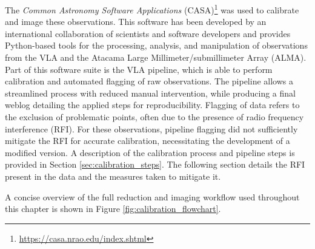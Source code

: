 The \textit{Common Astronomy Software Applications} (CASA)\footnote{\url{https://casa.nrao.edu/index.shtml}} was used to calibrate and image these observations. This software has been developed by an international collaboration of scientists and software developers and provides Python-based tools for the processing, analysis, and manipulation of observations from the VLA and the Atacama Large Millimeter/submillimeter Array (ALMA). Part of this software suite is the VLA pipeline, which is able to perform calibration and automated flagging of raw observations. The pipeline allows a streamlined process with reduced manual intervention, while producing a final weblog detailing the applied steps for reproducibility. Flagging of data refers to the exclusion of problematic points, often due to the presence of radio frequency interference (RFI). For these observations, pipeline flagging did not sufficiently mitigate the RFI for accurate calibration, necessitating the development of a modified version. A description of the calibration process and pipeline steps is provided in Section \ref{sec:calibration_steps}. The following section details the RFI present in the data and the measures taken to mitigate it.

A concise overview of the full reduction and imaging workflow used throughout this chapter is shown in Figure \ref{fig:calibration_flowchart}.




